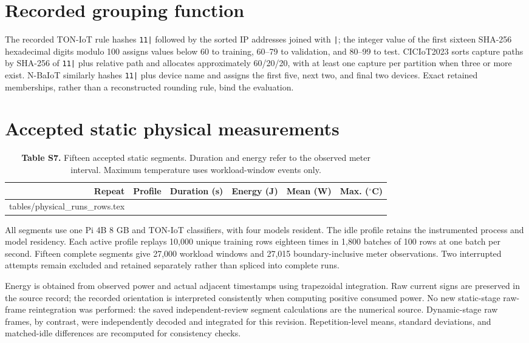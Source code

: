 \documentclass[10pt,a4paper]{article}
\makeatletter
\newcommand{\tableinput}[1]{\@@input #1.tex }
\makeatother
\begin{document}
\section{Recorded grouping function}
The recorded TON-IoT rule hashes \texttt{11|} followed by the sorted IP addresses joined with \texttt{|}; the integer value of the first sixteen SHA-256 hexadecimal digits modulo 100 assigns values below 60 to training, 60--79 to validation, and 80--99 to test. CICIoT2023 sorts capture paths by SHA-256 of \texttt{11|} plus relative path and allocates approximately 60/20/20, with at least one capture per partition when three or more exist. N-BaIoT similarly hashes \texttt{11|} plus device name and assigns the first five, next two, and final two devices. Exact retained memberships, rather than a reconstructed rounding rule, bind the evaluation.


\clearpage
\section{Accepted static physical measurements}
\begin{table}[h!]
\centering\small
\caption*{\textbf{Table S7.} Fifteen accepted static segments. Duration and energy refer to the observed meter interval. Maximum temperature uses workload-window events only.}
\begin{tabular}{rlrrrr}\toprule
Repeat & Profile & Duration (s) & Energy (J) & Mean (W) & Max. ($^\circ$C)\\\midrule
\tableinput{tables/physical_runs_rows}
\bottomrule\end{tabular}
\end{table}
All segments use one Pi 4B 8 GB and TON-IoT classifiers, with four models resident. The idle profile retains the instrumented process and model residency. Each active profile replays 10,000 unique training rows eighteen times in 1,800 batches of 100 rows at one batch per second. Fifteen complete segments give 27,000 workload windows and 27,015 boundary-inclusive meter observations. Two interrupted attempts remain excluded and retained separately rather than spliced into complete runs.

Energy is obtained from observed power and actual adjacent timestamps using trapezoidal integration. Raw current signs are preserved in the source record; the recorded orientation is interpreted consistently when computing positive consumed power. No new static-stage raw-frame reintegration was performed: the saved independent-review segment calculations are the numerical source. Dynamic-stage raw frames, by contrast, were independently decoded and integrated for this revision. Repetition-level means, standard deviations, and matched-idle differences are recomputed for consistency checks.
\end{document}
